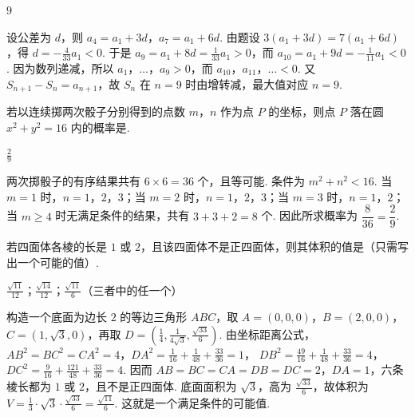\begin{answer}
\(9\)
\end{answer}

\begin{solution}
设公差为 \(d\)，则 \(a_{4}=a_{1}+3d\)，\(a_{7}=a_{1}+6d\). 由题设
\(3(a_{1}+3d)=7(a_{1}+6d)\)，得 \(d=-\frac{4}{33}a_{1}<0\). 于是 \(a_{9}=a_{1}+8d=\frac{1}{33}a_{1}>0\)，而 \(a_{10}=a_{1}+9d=-\frac{1}{11}a_{1}<0\). 因为数列递减，所以 \(a_1\)，\(\ldots\)，\(a_9>0\)，而 \(a_{10}\)，\(a_{11}\)，\(\ldots<0\). 又 \(S_{n+1}-S_n=a_{n+1}\)，故 \(S_n\) 在 \(n=9\) 时由增转减，最大值对应 \(n=9\).
\end{solution}

\begin{problem}
若以连续掷两次骰子分别得到的点数 \(m\)，\(n\) 作为点 \(P\) 的坐标，则点 \(P\) 落在圆 \(x^{2} + y^{2} = 16 \) 内的概率是\fillinblank{}.
\end{problem}

\begin{answer}
\(\frac{2}{9}\)
\end{answer}

\begin{solution}
两次掷骰子的有序结果共有 \(6\times6=36\) 个，且等可能. 条件为 \(m^{2}+n^{2}<16\). 当 \(m=1\) 时，\(n=1\)，\(2\)，\(3\)；当 \(m=2\) 时，\(n=1\)，\(2\)，\(3\)；当 \(m=3\) 时，\(n=1\)，\(2\)；当 \(m\geq4\) 时无满足条件的结果，共有 \(3+3+2=8\) 个. 因此所求概率为 \(\dfrac{8}{36}=\dfrac{2}{9}\).
\end{solution}

\begin{problem}
若四面体各棱的长是 \(1\) 或 \(2\)，且该四面体不是正四面体，则其体积的值是（只需写出一个可能的值）\fillinblank{}.
\end{problem}

\begin{answer}
\(\frac{\sqrt{11}}{12}\)；\(\frac{\sqrt{14}}{12}\)；\(\frac{\sqrt{11}}{6}\)（三者中的任一个）
\end{answer}

\begin{solution}
构造一个底面为边长 \(2\) 的等边三角形 \(ABC\)，取
\(A=(0,0,0)\)，\(B=(2,0,0)\)，\(C=(1,\sqrt3,0)\)，再取 \(D=\left(\frac14,\frac{1}{4\sqrt3},\frac{\sqrt{33}}{6}\right)\). 由坐标距离公式，
\(AB^{2}=BC^{2}=CA^{2}=4\)，\(DA^{2}=\frac1{16}+\frac1{48}+\frac{33}{36}=1\)，
\(DB^{2}=\frac{49}{16}+\frac1{48}+\frac{33}{36}=4\)，
\(DC^{2}=\frac9{16}+\frac{121}{48}+\frac{33}{36}=4\). 因而 \(AB=BC=CA=DB=DC=2\)，\(DA=1\)，六条棱长都为 \(1\) 或 \(2\)，且不是正四面体. 底面面积为 \(\sqrt3\)，高为 \(\frac{\sqrt{33}}{6}\)，故体积为
\(V=\frac13\cdot\sqrt3\cdot\frac{\sqrt{33}}{6}=\frac{\sqrt{11}}{6}\). 这就是一个满足条件的可能值.
\end{solution}

